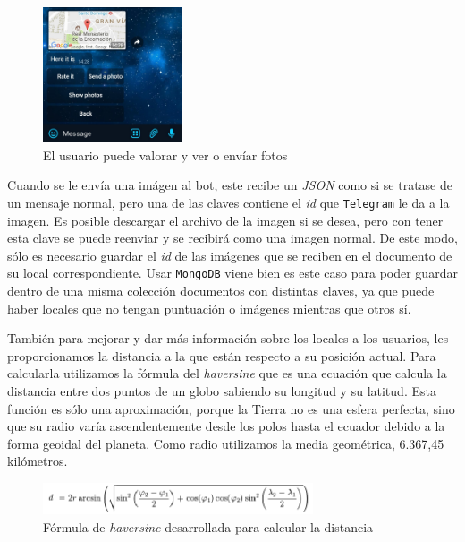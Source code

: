 \documentclass[oneside]{memoir}
\begin{document}
\begin{figure}[h!]
  \centering
  \includegraphics[height=40mm]{interaccionv2.jpg}
  \caption{El usuario puede valorar y ver o envíar fotos}
  \label{fig:interaccionv2}
\end{figure}

Cuando se le envía una imágen al bot, este recibe un \textit{JSON} como si se tratase de un mensaje normal, pero una de las claves contiene el \textit{id} que \texttt{Telegram} le da a la imagen. Es posible descargar el archivo de la imagen si se desea, pero con tener esta clave se puede reenviar y se recibirá como una imagen normal. De este modo, sólo es necesario guardar el \textit{id} de las imágenes que se reciben en el documento de su local correspondiente. Usar \texttt{MongoDB} viene bien es este caso para poder guardar dentro de una misma colección documentos con distintas claves, ya que puede haber locales que no tengan puntuación o imágenes mientras que otros sí.

También para mejorar y dar más información sobre los locales a los usuarios, les proporcionamos la distancia a la que están respecto a su posición actual. Para calcularla utilizamos la fórmula del \textit{haversine} que es una ecuación que calcula la distancia entre dos puntos de un globo sabiendo su longitud y su latitud. Esta función es sólo una aproximación, porque la Tierra no es una esfera perfecta, sino que su radio varía ascendentemente desde los polos hasta el ecuador debido a la forma geoidal del planeta. Como radio utilizamos la media geométrica, 6.367,45 kilómetros.

\begin{figure}[h!]
\centering
  \centering
  \includegraphics[width=80mm]{hav.png}
  \caption{Fórmula de \textit{haversine} desarrollada para calcular la distancia}
  \label{fig:hav}
\end{figure} 
\end{document}
